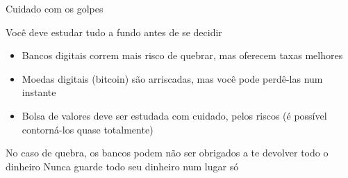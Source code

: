 \documentclass[]{beamer}
\begin{document}

\begin{frame}{Cuidado com os golpes}

\begin{tcolorbox}[
  colback=black!10!white, %
  colframe=black!70!white, %
  colupper=red!75!black, %
  collower=blue!75!black, %
  title=Não existe atalho nem caminho fácil]
  Você deve estudar tudo a fundo antes de se decidir
  \tcblower
  \begin{itemize}
  \item Bancos digitais correm mais risco de quebrar, mas
    oferecem taxas melhores
  \item Moedas digitais (bitcoin) são arriscadas, mas você
    pode perdê-las num instante
  \item Bolsa de valores deve ser estudada com cuidado,
    pelos riscos (é possível contorná-los quase totalmente)
  \end{itemize}
\end{tcolorbox}


  
\end{frame}



\begin{frame}[standout]{No caso de quebra, os bancos podem não ser
  obrigados a te devolver todo o dinheiro}
\Huge{Nunca guarde todo seu dinheiro num lugar só}
\end{frame}


\end{document}
